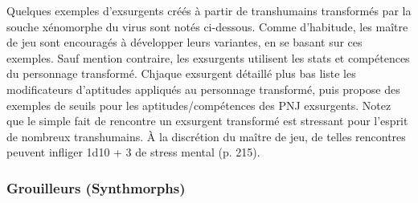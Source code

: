 Quelques exemples d'exsurgents créés à partir de transhumains transformés par la souche xénomorphe du virus sont notés ci-dessous. Comme d'habitude, les maître de jeu sont encouragés à développer leurs variantes, en se basant sur ces exemples. Sauf mention contraire, les exsurgents utilisent les stats et compétences du personnage transformé. Chjaque exsurgent détaillé plus bas liste les modificateurs d'aptitudes appliqués au personnage transformé, puis propose des exemples de seuils pour les aptitudes/compétences des PNJ exsurgents. Notez que le simple fait de rencontre un exsurgent transformé est stressant pour l'esprit de nombreux transhumains. À la discrétion du maître de jeu, de telles rencontres peuvent infliger 1d10 + 3 de stress mental (p. 215). 

\subsubsection{Grouilleurs (Synthmorphs)} 

